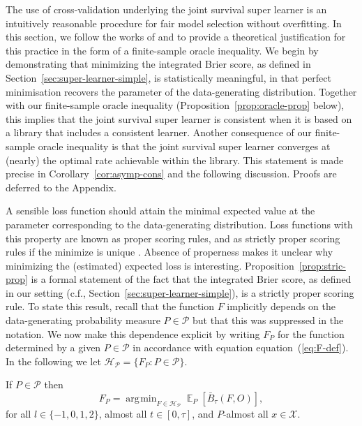 \documentclass[lineno]{biometrika}
\DeclareMathOperator{\E}{\mathbb{E}} %
\newcommand{\1}{\mathds{1}}
\DeclareMathOperator*{\argmin}{\arg\!\min}
\begin{document}
The use of cross-validation underlying the joint survival super
learner is an intuitively reasonable procedure for fair model
selection without overfitting. In this section, we follow the works of
\cite{van2003unicv} and \cite{vaart2006oracle} to provide a
theoretical justification for this practice in the form of a
finite-sample oracle inequality. We begin by demonstrating that
minimizing the integrated Brier score, as defined in
Section~\ref{sec:super-learner-simple}, is statistically meaningful,
in that perfect minimisation recovers the parameter of the
data-generating distribution. Together with our finite-sample oracle
inequality (Proposition~\ref{prop:oracle-prop} below), this implies
that the joint survival super learner is consistent when it is based
on a library that includes a consistent learner. Another consequence
of our finite-sample oracle inequality is that the joint survival
super learner converges at (nearly) the optimal rate achievable within
the library. This statement is made precise in
Corollary~\ref{cor:asymp-cons} and the following discussion. Proofs
are deferred to the Appendix.

A sensible loss function should attain the minimal expected value at
the parameter corresponding to the data-generating distribution. Loss
functions with this property are known as proper scoring rules, and as
strictly proper scoring rules if the minimize is unique
\citep{gneiting2007strictly}. Absence of properness makes it unclear
why minimizing the (estimated) expected loss is interesting.
Proposition~\ref{prop:stric-prop} is a formal statement of the fact
that the integrated Brier score, as defined in our setting (c.f.,
Section~\ref{sec:super-learner-simple}), is a strictly proper scoring
rule. To state this result, recall that the function \(F\) implicitly
depends on the data-generating probability measure \(P\in\mathcal P\)
but that this was suppressed in the notation. We now make this
dependence explicit by writing \(F_P\) for the function determined by
a given \(P \in\mathcal{P}\) in accordance with equation
equation~(\ref{eq:F-def}). In the following we let
\( \mathcal{H}_{\mathcal{P}} = \{F_P : P \in \mathcal{P}\} \).

\begin{proposition}
  \label{prop:stric-prop}
  If \(P \in\mathcal{P}\) then
  \begin{equation*}
    F_P = \argmin_{F \in \mathcal{H}_{\mathcal{P}}}
    \E_P{[\bar{B}_\tau(F, O)]}
    ,
  \end{equation*}
  for all \( l \in \{-1, 0, 1, 2 \} \), almost all
  \( t \in [0,\tau] \), and \( P \)-almost all
  \( x \in \mathcal{X} \).
\end{proposition}
\end{document}
